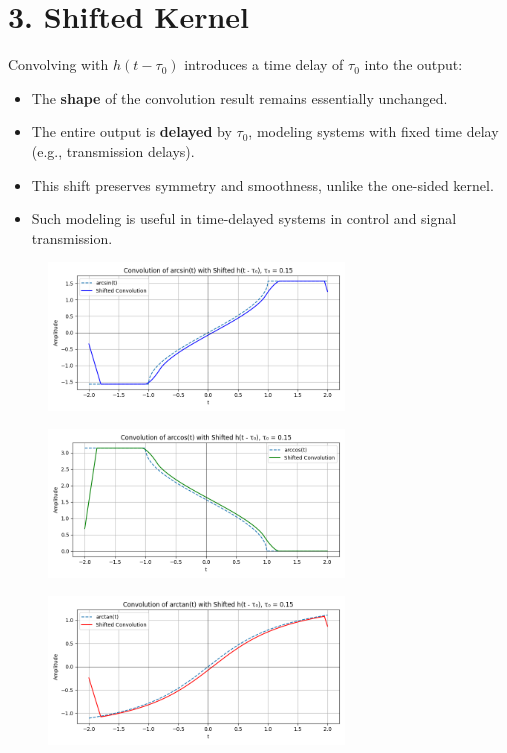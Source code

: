 \documentclass[12pt]{article}
\begin{document}
\section*{3. Shifted Kernel}
Convolving with $h(t - \tau_0)$ introduces a time delay of $\tau_0$ into the output:
\begin{itemize}
    \item The \textbf{shape} of the convolution result remains essentially unchanged.
    \item The entire output is \textbf{delayed} by $\tau_0$, modeling systems with fixed time delay (e.g., transmission delays).
    \item This shift preserves symmetry and smoothness, unlike the one-sided kernel.
    \item Such modeling is useful in time-delayed systems in control and signal transmission.
\end{itemize}
\begin{figure}[H]
    \centering
    \includegraphics[width=0.7\textwidth]{figs/shift1.png}
\end{figure}
\begin{figure}[H]
    \centering
    \includegraphics[width=0.7\textwidth]{figs/shift2.png}
\end{figure}
\begin{figure}[H]
    \centering
    \includegraphics[width=0.7\textwidth]{figs/shift3.png}
\end{figure}
\end{document}
